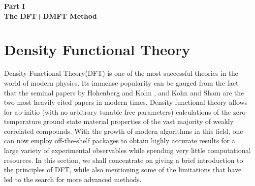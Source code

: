 \documentclass[10pt]{ruthesis}
\begin{document}
\clearpage
{}
\begin{center}
\begin{huge}
\vspace*{4in}
\textbf{Part I\\ 
\vspace{0.3 in}
 The DFT+DMFT Method}
\end{huge}

\end{center}



\pagebreak
\chapter{Density Functional Theory}

Density Functional Theory(DFT) is one of the most successful theories in the world of modern physics. Its immense popularity can be gauged from the fact that the seminal papers  by Hohenberg and Kohn \cite{Hohenberg_Kohn}, and Kohn and Sham \cite{Kohn_Sham} are the two most heavily cited papers in modern times. Density functional theory allows for ab-initio (with no arbitrary tunable free parameters) calculations of the zero-temperature ground state material properties of the vast majority of weakly correlated compounds. With the growth of modern algorithms in this field, one can now employ off-the-shelf packages to obtain highly accurate results for a large variety of experimental observables while spending very little computational resources. In this section, we shall concentrate on giving a brief introduction to the principles of DFT, while also mentioning some of the limitations that have led to the search for more advanced methods.
\end{document}
